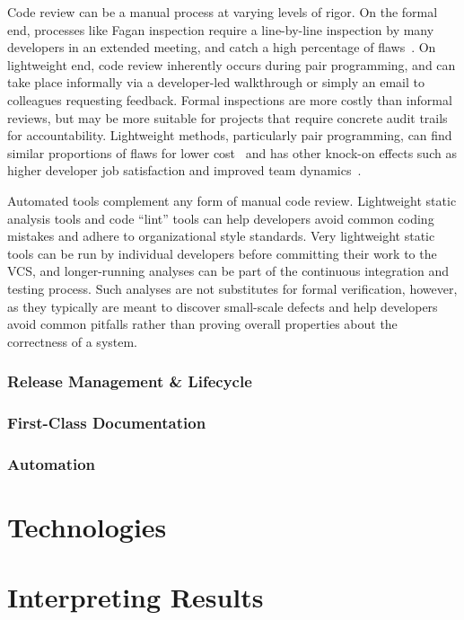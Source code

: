 Code review can be a manual process at varying levels of rigor. On the
formal end, processes like Fagan inspection require a line-by-line
inspection by many developers in an extended meeting, and catch a high
percentage of flaws~\cite{fagan2002design}. On lightweight end, code
review inherently occurs during pair programming, and can take place
informally via a developer-led walkthrough or simply an email to
colleagues requesting feedback. Formal inspections are more costly
than informal reviews, but may be more suitable for projects that
require concrete audit trails for accountability. Lightweight methods,
particularly pair programming, can find similar proportions of flaws
for lower cost~\cite{tomayko2002comparison} and has other knock-on
effects such as higher developer job satisfaction and improved team
dynamics~\cite{cockburn2000costs}.

Automated tools complement any form of manual code review. Lightweight
static analysis tools and code ``lint'' tools can help developers
avoid common coding mistakes and adhere to organizational style
standards. Very lightweight static tools can be run by individual
developers before committing their work to the VCS, and longer-running
analyses can be part of the continuous integration and testing
process. Such analyses are not substitutes for formal verification,
however, as they typically are meant to discover small-scale defects
and help developers avoid common pitfalls rather than proving overall
properties about the correctness of a system.

\subsubsection{Release Management \& Lifecycle}

\subsubsection{First-Class Documentation}

\subsubsection{Automation}

\section{Technologies}
\section{Interpreting Results}
